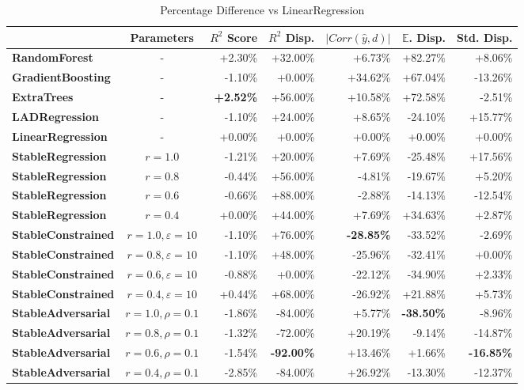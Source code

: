 \documentclass{article}
\begin{document}
\begin{table}[!h]
\caption{Percentage Difference vs LinearRegression}
\label{tab:performance_diff}
\begin{tabular}{|l|c|r|r|r|r|r|}
\toprule
 & Parameters & \textbf{$R^2$ Score} & \textbf{$R^2$ Disp.} & \textbf{$|Corr(\hat{y}, d)|$} & \textbf{$\mathbb{E}$. Disp.} & \textbf{Std. Disp.} \\
\midrule
\textbf{RandomForest}     & - & +2.30\% & +32.00\% & +6.73\% & +82.27\% & +8.06\% \\
\textbf{GradientBoosting} & - & -1.10\% & +0.00\% & +34.62\% & +67.04\% & -13.26\% \\
\textbf{ExtraTrees}       & - & \textbf{+2.52\%} & +56.00\% & +10.58\% & +72.58\% & -2.51\% \\
\textbf{LADRegression}    & - & -1.10\% & +24.00\% & +8.65\% & -24.10\% & +15.77\% \\
\textbf{LinearRegression} & - & +0.00\% & +0.00\% & +0.00\% & +0.00\% & +0.00\% \\
\textbf{StableRegression} & $r=1.0$ & -1.21\% & +20.00\% & +7.69\% & -25.48\% & +17.56\% \\
\textbf{StableRegression} & $r=0.8$ & -0.44\% & +56.00\% & -4.81\% & -19.67\% & +5.20\% \\
\textbf{StableRegression} & $r=0.6$ & -0.66\% & +88.00\% & -2.88\% & -14.13\% & -12.54\% \\
\textbf{StableRegression} & $r=0.4$ & +0.00\% & +44.00\% & +7.69\% & +34.63\% & +2.87\% \\
\midrule
\textbf{StableConstrained} & $r=1.0,\varepsilon=10$ & -1.10\% & +76.00\% & \textbf{-28.85\%} & -33.52\% & -2.69\% \\
\textbf{StableConstrained} & $r=0.8,\varepsilon=10$ & -1.10\% & +48.00\% & -25.96\% & -32.41\% & +0.00\% \\
\textbf{StableConstrained} & $r=0.6,\varepsilon=10$ & -0.88\% & +0.00\% & -22.12\% & -34.90\% & +2.33\% \\
\textbf{StableConstrained} & $r=0.4,\varepsilon=10$ & +0.44\% & +68.00\% & -26.92\% & +21.88\% & +5.73\% \\
\textbf{StableAdversarial} & $r=1.0,\rho=0.1$& -1.86\% & -84.00\% & +5.77\% & \textbf{-38.50\%} & -8.96\% \\
\textbf{StableAdversarial} & $r=0.8,\rho=0.1$& -1.32\% & -72.00\% & +20.19\% & -9.14\% & -14.87\% \\
\textbf{StableAdversarial} & $r=0.6,\rho=0.1$& -1.54\% & \textbf{-92.00\%} & +13.46\% & +1.66\% & \textbf{-16.85\%} \\
\textbf{StableAdversarial} & $r=0.4,\rho=0.1$& -2.85\% & -84.00\% & +26.92\% & -13.30\% & -12.37\% \\
\bottomrule
\end{tabular}
\end{table}
\end{document}
